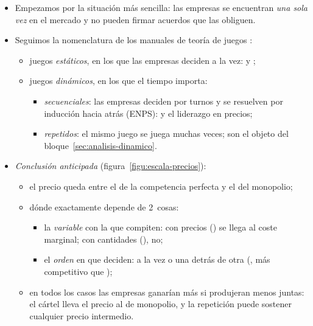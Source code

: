 \documentclass[11pt]{article}
\begin{document}
\begin{itemize}
\item Empezamos por la situación más sencilla: las empresas se encuentran \emph{una sola vez} en el mercado y no pueden firmar acuerdos que las obliguen.
\item Seguimos la nomenclatura de los manuales de teoría de juegos :
  \begin{itemize}
  \item juegos \emph{estáticos}, en los que las empresas deciden a la vez:  y ;
  \item juegos \emph{dinámicos}, en los que el tiempo importa:
    \begin{itemize}
    \item \emph{secuenciales}: las empresas deciden por turnos y se resuelven por inducción hacia atrás (ENPS):  y el liderazgo en precios;
    \item \emph{repetidos}: el mismo juego se juega muchas veces; son el objeto del bloque~\ref{sec:analisis-dinamico}.
    \end{itemize}
  \end{itemize}
\item \emph{Conclusión anticipada} (figura~\ref{figu:escala-precios}):
  \begin{itemize}
  \item el precio queda entre el de la competencia perfecta y el del monopolio;
  \item dónde exactamente depende de 2~cosas:
    \begin{itemize}
    \item la \emph{variable} con la que compiten: con precios () se llega al coste marginal; con cantidades (), no;
    \item el \emph{orden} en que deciden: a la vez o una detrás de otra (, más competitivo que );
    \end{itemize}
  \item en todos los casos las empresas ganarían más si produjeran menos juntas: el cártel lleva el precio al de monopolio, y la repetición puede sostener cualquier precio intermedio.
  \end{itemize}
\end{itemize}

\begin{infografia}[H]
\centering
\caption{Dónde queda el precio de cada modelo, entre la competencia perfecta y el monopolio (duopolio con demanda lineal y costes iguales)}\label{figu:escala-precios}
\end{infografia}
\end{document}
